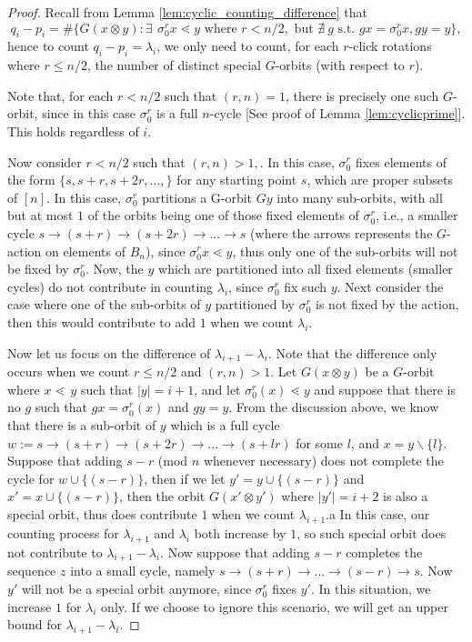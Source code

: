 \documentclass{amsart}
\theoremstyle{remark}
\newcommand{\ra}{\rightarrow}
\newcommand{\minus}{\backslash}
\begin{document}
\begin{proof} 

Recall from Lemma \ref{lem:cyclic_counting_difference} that 
 $$q_i - p_i = \#\{G{(x \otimes y)} : \exists \: \, \sigma_0^r x \lessdot y \text{ where } r < n/2, \text{ but } \nexists \:  g \text{ s.t. } g x = \sigma_0 ^r x, g y = y \},$$ 
hence to count $q_i - p_i = \lambda_i $, we only need to count, for each $r$-click rotations where $r \le n/2$, the number of distinct special $G$-orbits (with respect to $r$).

Note that, for each $r < n/2$ such that $(r, n) = 1$, there is precisely one such $G$-orbit, since in this case $\sigma_0^r$ is a full $n$-cycle [See proof of Lemma \ref{lem:cyclicprime}]. 
This holds regardless of $i$. 

Now consider $r < n/2$ such that $(r, n) > 1,$. In this case, $\sigma_0^r$ fixes elements of the form $\{s, s+r, s+2r, ..., \}$ for any starting point $s$, which are proper subsets of $[n]$. In this case, $\sigma_0^r$ partitions a G-orbit $Gy$ into many sub-orbits, with all but at most $1$ of the orbits being one of those fixed elements of $\sigma_0^r$, i.e., a smaller cycle $s \ra (s+r) \ra (s+2r) \ra ... \ra s$ (where the arrows represents the $G$-action on elements of $B_n$),  since $\sigma_0^r x \lessdot y$, thus only one of the sub-orbits will not be fixed by $\sigma_0^r.$ Now, the $y$ which are partitioned into all fixed elements (smaller cycles) do not contribute in counting $\lambda_i$, since $\sigma_0^r$ fix such $y$. Next consider the case where one of the sub-orbits of $y$ partitioned by $\sigma_0^r$ is not fixed by the action, then this would contribute to add $1$ when we count $\lambda_i$. 

Now let us focus on the difference of $\lambda_{i+1} - \lambda_{i}$. Note that the difference only occurs when we count $r \le n/2$ and $(r, n) > 1$. Let $G{(x \otimes y)}$ be a $G$-orbit where $x \lessdot \, y$ such that $|y| = i+1$, and let $\sigma_0^{r} (x) \lessdot  y$ and suppose that there is no $g$ such that $g x = \sigma_0 ^r (x)$ and $gy = y$. From the discussion above, we know that there is a sub-orbit of $y$ which is a full cycle $w := s \ra (s+r) \ra (s+2r) \ra ... \ra (s+ lr)$  for some $l $, and $x = y \minus \{l\} $. Suppose that adding $s-r $ (mod $n$ whenever necessary) does not complete the cycle for  $w \cup \{(s - r)\}$, then if we let  $y' = y \cup \{(s - r) \} $ and $x' = x \cup \{(s -r)\}$, then the orbit $G{(x' \otimes y')}$ where $|y'| = i+2$ is also a special orbit, thus does contribute $1$ when we count $\lambda_{i+1}$.a   In this case, our counting process for $\lambda_{i+1}$ and $\lambda_{i}$ both increase by $1$, so such special orbit does not contribute to $\lambda_{i+1} - \lambda_{i}$. Now suppose that adding $s -r$ completes the sequence $z$ into a small cycle, namely $s \ra (s+r) \ra ... \ra (s-r) \ra s$. Now $y'$ will not be a special orbit anymore, since $\sigma_0^r $ fixes $y'$. In this situation,  we increase  $1$ for $\lambda_i$ only. If we choose to ignore this scenario, we will get an upper bound for $\lambda_{i+1} - \lambda_i$. 


\end{proof}
\end{document}

